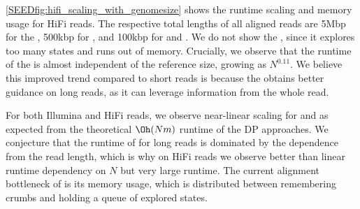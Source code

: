 \cref{SEEDfig:hifi_scaling_with_genomesize} shows the runtime scaling and memory
usage for HiFi reads. The respective total lengths of all aligned reads are 5Mbp
for the \seedh, 500kbp for \graphaligner, and 100kbp for \vargas and \pasgal. We
do not show the \prefixh, since it explores too many states and runs out of
memory.
%
Crucially, we observe that the runtime of the \seedh is almost independent of
the reference size, growing as $N^{0.11}$. We believe this improved trend
compared to short reads is because the \seedh obtains better guidance on long
reads, as it can leverage information from the whole read.

For both Illumina and HiFi reads, we observe near-linear scaling for \pasgal and
\graphaligner as expected from the theoretical $\Oh(Nm)$ runtime of the DP
approaches. We conjecture that the runtime of \vargas for long reads is
dominated by the dependence from the read length, which is why on HiFi reads we
observe better than linear runtime dependency on $N$ but very large runtime. The
current alignment bottleneck of \astarixseeds is its memory usage, which is
distributed between remembering crumbs and holding a queue of explored states.